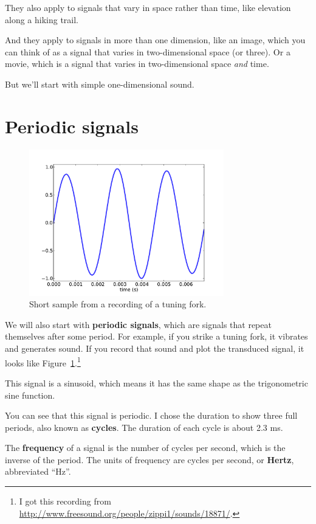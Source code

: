 \documentclass[12pt]{book}
\begin{document}
They also apply to signals that vary in
space rather than time, like elevation along a hiking trail.

And they apply to signals in more than one dimension, like an
image, which you can think of as a signal that varies in two-dimensional
space (or three).  Or a movie, which is a signal that varies
in two-dimensional space {\it and} time.

But we'll start with simple one-dimensional sound.


\section{Periodic signals}

\begin{figure}
\centerline{\includegraphics[height=2.5in]{figs/tuning1.pdf}}
\caption{Short sample from a recording of a tuning fork.}
\label{fig.tuning1}
\end{figure}


We will also start with {\bf periodic signals}, which are signals
that repeat themselves after some period.  For example, if you
strike a tuning fork, it vibrates and generates sound.  If you
record that sound and plot the transduced signal, it looks like
Figure~\ref{fig.tuning1}.\footnote{I got this recording from
\url{http://www.freesound.org/people/zippi1/sounds/18871/}.}

This signal is a sinusoid, which means it has the same shape as
the trigonometric sine function. 

You can see that this signal is periodic.  I chose the duration
to show three full periods, also known as {\bf cycles}.
The duration of each cycle is
about 2.3 ms.

The {\bf frequency} of a signal is the number of cycles
per second, which is the inverse of the period.
The units of frequency are cycles per second, or {\bf Hertz},
abbreviated ``Hz''.
\end{document}
